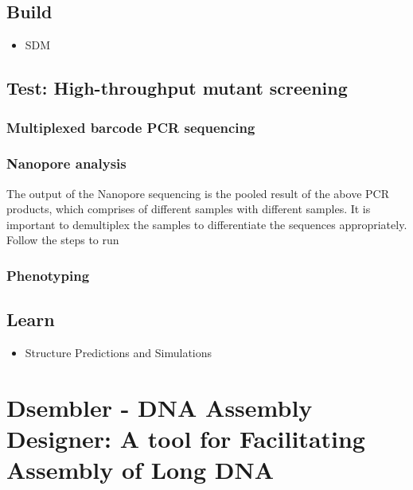 \documentclass[
  letterpaper,
]{book}
\providecommand{\tightlist}{%
  \setlength{\itemsep}{0pt}\setlength{\parskip}{0pt}}\usepackage{longtable,booktabs,array}
\begin{document}
\section{Build}\label{build-1}

\begin{itemize}
\tightlist
\item
  SDM
\end{itemize}

\newpage

\section{Test: High-throughput mutant
screening}\label{test-high-throughput-mutant-screening}

\subsection{Multiplexed barcode PCR
sequencing}\label{multiplexed-barcode-pcr-sequencing}

\subsection{Nanopore analysis}\label{nanopore-analysis-1}

The output of the Nanopore sequencing is the pooled result of the above
PCR products, which comprises of different samples with different
samples. It is important to demultiplex the samples to differentiate the
sequences appropriately. Follow the steps to run

\subsection{Phenotyping}\label{phenotyping}

\newpage

\section{Learn}\label{learn-1}

\begin{itemize}
\tightlist
\item
  Structure Predictions and Simulations
\end{itemize}


\chapter{Dsembler - DNA Assembly Designer: A tool for Facilitating
Assembly of Long
DNA}\label{dsembler---dna-assembly-designer-a-tool-for-facilitating-assembly-of-long-dna}
\end{document}
